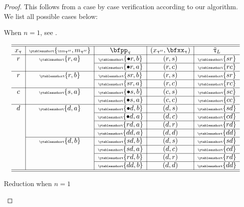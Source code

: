 \documentclass[12pt,a4paper]{amsart}
\numberwithin{equation}{section}
\theoremstyle{remark}
\let\ytb=\ytableaushort
\newcommand{\tytb}[1]{{\tiny\ytb{#1}}}
\def\uptaupp{\uptau^{\prime\prime}}
\def\tuptau{\tilde{\uptau}}
\begin{document}
  \begin{proof}
    This follows from a case by case verification according to our algorithm.
    We list all possible cases below:

    When $n=1$, see .%
    \begin{table}[p]
      \[
        \begin{array}{c|c|c|c|c}
          \hline
          \hline
          x_{\uptau} & \tytb{{\txx_{\uptaupp}},{m_{\uptaupp}}} & \bfpp_{\uptau} & (x_{\uptaupp},\bfxx_{\uptau}) & \tuptau_{L} \\
          \hline
          r & \tytb{r,a} &  \tytb{\bullet r,b} & (r,s) & \tytb{sr} \\
          \cline{3-5}
                     &            &  \tytb{\bullet r,a} & (r,c) & \tytb{rc} \\
          \hline
          r & \tytb{r,b} &  \tytb{sr,b} & (r,s) & \tytb{sr} \\
          \cline{3-5}
                     &            &  \tytb{sr,a} & (r,c) & \tytb{rc} \\
          \hline
          c & \tytb{s,a} &  \tytb{\bullet s,b} & (c,s) & \tytb{sc} \\
          \cline{3-5}
                     &            &  \tytb{\bullet s,a} & (c,c) & \tytb{cc} \\
          \hline
          d & \tytb{d,a} & \tytb{\bullet d,b} & (d,s) & \tytb{sd} \\
          \cline{3-5}
                     &            & \tytb{\bullet d,a} & (d,c) & \tytb{cd} \\
          \cline{3-5}
                     &            & \tytb{r d,a} & (d,r) & \tytb{rd} \\
          \cline{3-5}
                     &            & \tytb{d d,a} & (d,d) & \tytb{dd} \\
          \cline{2-5}
                     & \tytb{d,b} & \tytb{s d,b} & (d,s) & \tytb{sd} \\
          \cline{3-5}
                     &            & \tytb{s d,a} & (d,c) & \tytb{cd} \\
          \cline{3-5}
                     &            & \tytb{r d,b} & (d,r) & \tytb{rd} \\
          \cline{3-5}
                     &            & \tytb{d d,b} & (d,d) & \tytb{dd} \\
          \hline
          \hline
        \end{array}
      \]
      \caption{Reduction when $n=1$}
      \label{tb:rd1}
    \end{table}


\end{proof}
\end{document}
